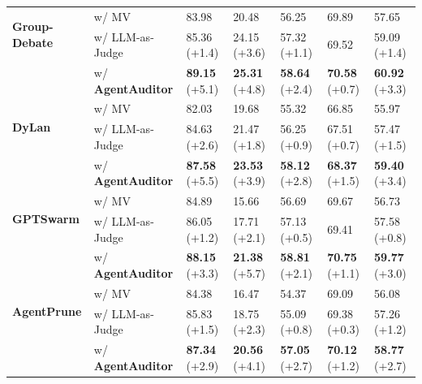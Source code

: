 \documentclass{article}
\newcommand{\cgap}[1]{\scriptsize{\color{teal}(+#1)}}
\theoremstyle{plain}
\theoremstyle{definition}
\theoremstyle{remark}
\begin{document}
\begin{table}[t]
\begin{tabular}{l l l l l l l}
\multirow{2}{*}{\textbf{Group-Debate}} 
 & w/ MV & 83.98 & 20.48 & 56.25 & 69.89 & 57.65\\
 & w/ LLM-as-Judge & 85.36 \cgap{1.4} & 24.15 \cgap{3.6} & 57.32 \cgap{1.1} & 69.52 & 59.09 \cgap{1.4}\\
 & \cellcolor{graybg}w/ \textbf{AgentAuditor} & \cellcolor{graybg}\textbf{89.15} \cgap{5.1} & \cellcolor{graybg}\textbf{25.31} \cgap{4.8} & \cellcolor{graybg}\textbf{58.64} \cgap{2.4} & \cellcolor{graybg}\textbf{70.58} \cgap{0.7} &
 \cellcolor{graybg}\textbf{60.92} \cgap{3.3}\\
\midrule

\multirow{2}{*}{\textbf{DyLan}} 
 & w/ MV & 82.03 & 19.68 & 55.32 & 66.85 & 55.97\\
 & w/ LLM-as-Judge & 84.63 \cgap{2.6} & 21.47 \cgap{1.8} & 56.25 \cgap{0.9} & 67.51 \cgap{0.7} & 57.47 \cgap{1.5}\\
 & \cellcolor{graybg}w/ \textbf{AgentAuditor} & \cellcolor{graybg}\textbf{87.58} \cgap{5.5} & \cellcolor{graybg}\textbf{23.53} \cgap{3.9} & \cellcolor{graybg}\textbf{58.12} \cgap{2.8} & \cellcolor{graybg}\textbf{68.37} \cgap{1.5} &
 \cellcolor{graybg}\textbf{59.40} \cgap{3.4}\\
\midrule

\multirow{2}{*}{\textbf{GPTSwarm}} 
 & w/ MV & 84.89 & 15.66 & 56.69 & 69.67 & 56.73\\
 & w/ LLM-as-Judge & 86.05 \cgap{1.2} & 17.71 \cgap{2.1} & 57.13 \cgap{0.5} & 69.41 & 57.58 \cgap{0.8}\\
 & \cellcolor{graybg}w/ \textbf{AgentAuditor} & \cellcolor{graybg}\textbf{88.15} \cgap{3.3} & \cellcolor{graybg}\textbf{21.38} \cgap{5.7} & \cellcolor{graybg}\textbf{58.81} \cgap{2.1} & \cellcolor{graybg}\textbf{70.75} \cgap{1.1} &
 \cellcolor{graybg}\textbf{59.77} \cgap{3.0}\\
\midrule

\multirow{2}{*}{\textbf{AgentPrune}} 
 & w/ MV & 84.38 & 16.47 & 54.37 & 69.09 & 56.08\\
 & w/ LLM-as-Judge & 85.83 \cgap{1.5} & 18.75 \cgap{2.3} & 55.09 \cgap{0.8} & 69.38 \cgap{0.3} & 57.26 \cgap{1.2}\\
 & \cellcolor{graybg}w/ \textbf{AgentAuditor} & \cellcolor{graybg}\textbf{87.34} \cgap{2.9} & \cellcolor{graybg}\textbf{20.56} \cgap{4.1} & \cellcolor{graybg}\textbf{57.05} \cgap{2.7} & \cellcolor{graybg}\textbf{70.12} \cgap{1.2} &
 \cellcolor{graybg}\textbf{58.77} \cgap{2.7}\\


\bottomrule
\end{tabular}
\end{table}
\end{document}

